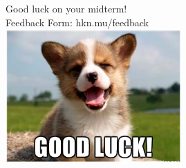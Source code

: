 \documentclass{beamer}
\begin{document}
    \begin{frame}{}
        \begin{center}
            Good luck on your midterm!\\
            Feedback Form: hkn.mu/feedback\\
            \includegraphics[]{dog.png}
        \end{center}
        
    \end{frame}

    
\end{document}
